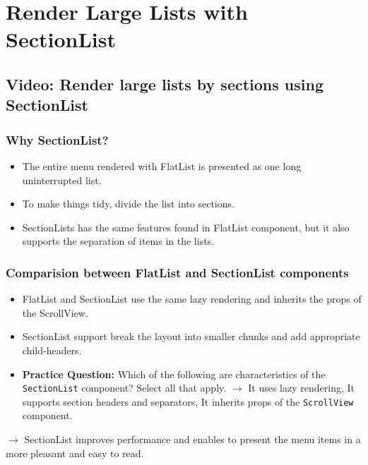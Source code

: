 \chapter{Render Large Lists with SectionList}

\section{Video: Render large lists by sections using SectionList}
\subsection{Why SectionList?}
\begin{itemize}
    \item The entire menu rendered with FlatList is presented as one long uninterrupted list. 
    \item To make things tidy, divide the list into sections.
    \item SectionLists has the same features found in FlatList component, but it also supports the separation of items in the lists.
\end{itemize}

\subsection{Comparision between FlatList and SectionList components}
\begin{itemize}
    \item FlatList and SectionList use the same lazy rendering and inherits the props of the ScrollView.
    \item SectionList support break the layout into smaller chunks and add appropriate child-headers.
    \item \textbf{Practice Question:} Which of the following are characteristics of the \texttt{SectionList} component? Select all that apply.
    $\rightarrow$ It uses lazy rendering, It supports section headers and separators, It inherits props of the \texttt{ScrollView} component.
\end{itemize}

$\rightarrow$ SectionList improves performance and enables to present the menu items in a more pleasant and easy to read.

